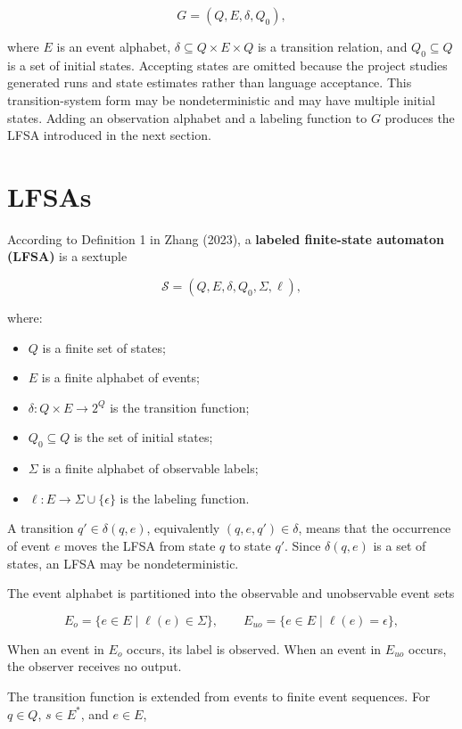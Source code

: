 \documentclass[11pt]{article}
\begin{document}
\[
G=(Q,E,\delta,Q_0),
\]

\noindent
where $E$ is an event alphabet, $\delta\subseteq Q\times E\times Q$ is a transition relation, and $Q_0\subseteq Q$ is a set of initial states. Accepting states are omitted because the project studies generated runs and state estimates rather than language acceptance. This transition-system form may be nondeterministic and may have multiple initial states. Adding an observation alphabet and a labeling function to $G$ produces the LFSA introduced in the next section.

\section{LFSAs}


According to Definition 1 in Zhang (2023), a \textbf{labeled finite-state automaton (LFSA)} is a sextuple

\[
\mathcal{S}=(Q,E,\delta,Q_0,\Sigma,\ell),
\]

where:

\begin{itemize}
\item $Q$ is a finite set of states;
\item $E$ is a finite alphabet of events;
\item $\delta:Q\times E\rightarrow 2^Q$ is the transition function;
\item $Q_0\subseteq Q$ is the set of initial states;
\item $\Sigma$ is a finite alphabet of observable labels;
\item $\ell:E\rightarrow\Sigma\cup\{\epsilon\}$ is the labeling function.

\end{itemize}

A transition $q'\in\delta(q,e)$, equivalently $(q,e,q')\in\delta$, means that the occurrence of event $e$ moves the LFSA from state $q$ to state $q'$. Since $\delta(q,e)$ is a set of states, an LFSA may be nondeterministic. 

The event alphabet is partitioned into the observable and unobservable event sets

\[
E_o=\{e\in E\mid\ell(e)\in\Sigma\},
\qquad
E_{uo}=\{e\in E\mid\ell(e)=\epsilon\},
\]

When an event in $E_o$ occurs, its label is observed. When an event in $E_{uo}$ occurs, the observer receives no output.

The transition function is extended from events to finite event sequences. For $q\in Q$, $s\in E^*$, and $e\in E$,
\end{document}
